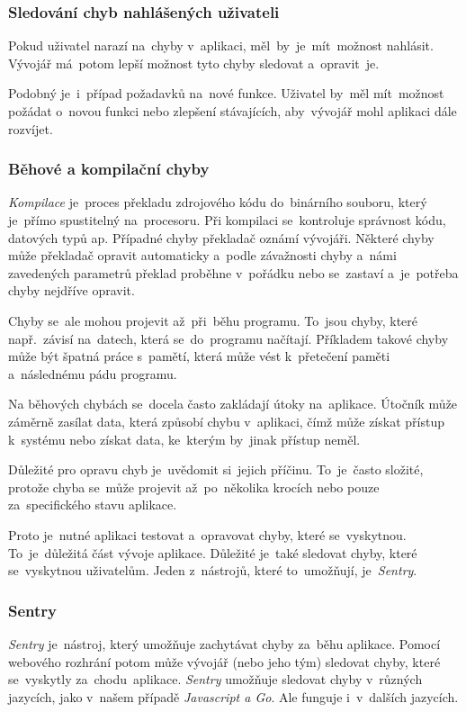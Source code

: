 \documentclass[10pt,a4paper]{article}
\begin{document}
                \subsubsection{Sledování chyb nahlášených uživateli}
                Pokud uživatel narazí na~chyby v~aplikaci, měl~by~je~mít~možnost nahlásit. Vývojář má~potom lepší možnost tyto chyby sledovat a~opravit~je.

                Podobný je~i~případ požadavků na~nové funkce. Uživatel by~měl mít~možnost požádat o~novou funkci nebo zlepšení stávajících,
                aby~vývojář mohl aplikaci dále rozvíjet.

            \subsubsection{Běhové a kompilační chyby}
                \emph{Kompilace} je~proces překladu zdrojového kódu do~binárního souboru, který je~přímo spustitelný na~procesoru. Při kompilaci se~kontroluje správnost kódu, datových typů ap. Případné chyby překladač oznámí vývojáři. Některé chyby může překladač opravit automaticky a~podle závažnosti chyby a~námi zavedených parametrů překlad proběhne v~pořádku nebo se~zastaví a~je~potřeba chyby nejdříve opravit.

                Chyby se~ale mohou projevit až~při~běhu programu. To~jsou chyby, které např.~závisí na~datech, která se~do~programu načítají. Příkladem takové chyby může být špatná práce s~pamětí, která může vést k~přetečení paměti a~následnému pádu programu.

                Na běhových chybách se~docela často zakládají útoky na~aplikace. Útočník může záměrně zasílat data, která způsobí chybu v~aplikaci, čímž může získat přístup k~systému nebo získat data, ke~kterým by~jinak přístup neměl.

                Důležité pro opravu chyb je~uvědomit si~jejich příčinu. To~je~často složité, protože chyba se~může projevit až~po~několika krocích nebo pouze za~specifického stavu aplikace. \cite{graham2021ethical}

                Proto je~nutné aplikaci testovat a~opravovat chyby, které se~vyskytnou. To~je~důležitá část vývoje aplikace. Důležité je~také sledovat chyby, které se~vyskytnou uživatelům. Jeden z~nástrojů, které to~umožňují, je~\emph{Sentry}.

            \subsubsection{Sentry}
                \emph{Sentry} je~nástroj, který umožňuje zachytávat chyby za~běhu aplikace. Pomocí webového rozhrání potom může vývojář (nebo jeho tým) sledovat chyby, které se~vyskytly za~chodu~aplikace. \emph{Sentry} umožňuje sledovat chyby v~různých jazycích, jako v~našem případě \emph{Javascript a Go}. Ale funguje i~v~dalších jazycích.
\end{document}
